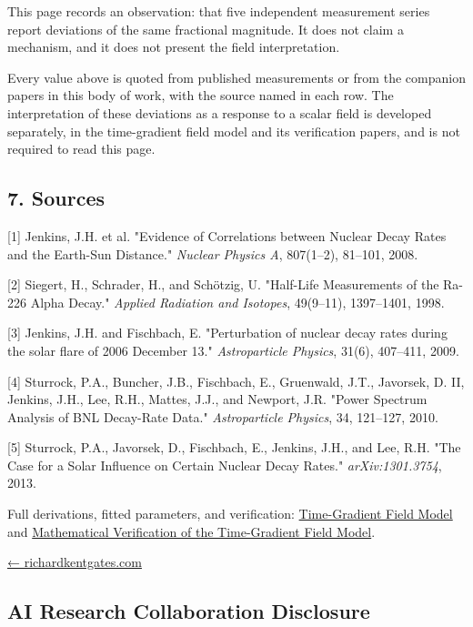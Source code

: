 \documentclass[
  10pt,
]{article}
\begin{document}
This page records an observation: that five independent measurement
series report deviations of the same fractional magnitude. It does not
claim a mechanism, and it does not present the field interpretation.

Every value above is quoted from published measurements or from the
companion papers in this body of work, with the source named in each
row. The interpretation of these deviations as a response to a scalar
field is developed separately, in the time-gradient field model and its
verification papers, and is not required to read this page.

\hypertarget{sources}{%
\subsection{7. Sources}\label{sources}}

{[}1{]} Jenkins, J.H. et al. "Evidence of Correlations between Nuclear
Decay Rates and the Earth-Sun Distance." \emph{Nuclear Physics A},
807(1--2), 81--101, 2008.

{[}2{]} Siegert, H., Schrader, H., and Schötzig, U. "Half-Life
Measurements of the Ra-226 Alpha Decay." \emph{Applied Radiation and
Isotopes}, 49(9--11), 1397--1401, 1998.

{[}3{]} Jenkins, J.H. and Fischbach, E. "Perturbation of nuclear decay
rates during the solar flare of 2006 December 13." \emph{Astroparticle
Physics}, 31(6), 407--411, 2009.

{[}4{]} Sturrock, P.A., Buncher, J.B., Fischbach, E., Gruenwald, J.T.,
Javorsek, D. II, Jenkins, J.H., Lee, R.H., Mattes, J.J., and Newport,
J.R. "Power Spectrum Analysis of BNL Decay-Rate Data."
\emph{Astroparticle Physics}, 34, 121--127, 2010.

{[}5{]} Sturrock, P.A., Javorsek, D., Fischbach, E., Jenkins, J.H., and
Lee, R.H. "The Case for a Solar Influence on Certain Nuclear Decay
Rates." \emph{arXiv:1301.3754}, 2013.

Full derivations, fitted parameters, and verification:
\href{https://richardkentgates.com/papers/time-gradient-field-model.html}{Time-Gradient
Field Model} and
\href{https://richardkentgates.com/papers/time_gradient_verification.html}{Mathematical
Verification of the Time-Gradient Field Model}.

\href{https://richardkentgates.com/}{← richardkentgates.com}

\hypertarget{ai-research-collaboration-disclosure}{%
\subsection{AI Research Collaboration
Disclosure}\label{ai-research-collaboration-disclosure}}
\end{document}
